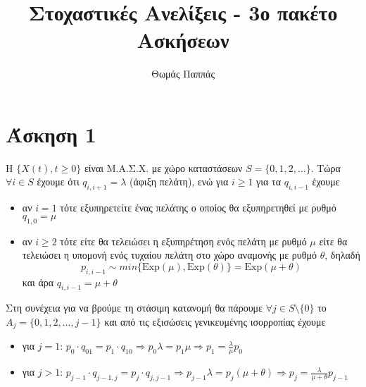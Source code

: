 \documentclass[a4paper,11pt]{article}
\newcommand{\Exp}{\mathrm{Exp}}
\newcommand{\mc}{Μ.Α.Σ.Χ. }
\begin{document}
\title{Στοχαστικές Ανελίξεις - 3ο πακέτο Ασκήσεων}
\author{Θωμάς Παππάς}
\date{}
\maketitle

\section*{Άσκηση 1}

Η $\{X(t),t\geq 0\}$ είναι \mc με χώρο καταστάσεων $S = \{0,1,2,\dots\}$.
Τώρα $\forall i \in S$ έχουμε ότι $q_{i,i+1} = \lambda$ (άφιξη πελάτη), ενώ για $i \geq 1$ για τα $q_{i,i-1}$ έχουμε
\begin{itemize}
	\item αν $i=1$ τότε εξυπηρετείτε ένας πελάτης ο οποίος θα εξυπηρετηθεί με ρυθμό $q_{1,0}=\mu$
	\item αν $i \geq 2$ τότε είτε θα τελειώσει η εξυπηρέτηση ενός πελάτη με ρυθμό $\mu$ είτε θα τελειώσει η υπομονή ενός τυχαίου πελάτη στο χώρο αναμονής με ρυθμό $\theta$, δηλαδή
	\[p_{i,i-1} \sim min\{\Exp(\mu), \Exp(\theta)\} = \Exp(\mu+\theta)\]
	και άρα $q_{i,i-1}=\mu+\theta$
\end{itemize}
\begin{center}
\end{center}
Στη συνέχεια για να βρούμε τη στάσιμη κατανομή θα πάρουμε $\forall j \in S\setminus \{0\}$ το\\
$A_j = \{0,1,2,\dots,j-1\}$ και από τις εξισώσεις γενικευμένης ισορροπίας έχουμε
\begin{itemize}
	\item για $j=1$: $p_0 \cdot q_{01} = p_1 \cdot q_{10} \Rightarrow p_0 \lambda = p_1 \mu \Rightarrow p_1 = \frac{\lambda}{\mu} p_0$
	\item για $j>1$: $p_{j-1} \cdot q_{j-1,j} = p_j \cdot q_{j,j-1} \Rightarrow p_{j-1} \lambda = p_j (\mu+\theta) \Rightarrow p_j = \frac{\lambda}{\mu+\theta} p_{j-1}$
\end{itemize}
\end{document}
